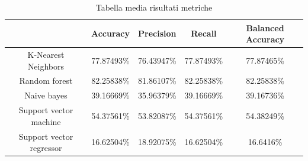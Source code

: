 \begin{table}
    \small %
    \caption{Tabella media risultati metriche}
    \label{tab:1}
    \begin{tabular}{ |c||c|c|c|c| } 
         \hline
          & Accuracy & Precision & Recall & Balanced Accuracy\\ 
         \hline\hline
         K-Nearest Neighbors& 77.87493\% & 76.43947\% & 77.87493\% & 77.87465\%\\
         \hline
         Random forest & 82.25838\% & 81.86107\% & 82.25838\% & 82.25838\%\\
         \hline
         Naive bayes& 39.16669\% & 35.96379\% & 39.16669\% & 39.16736\%\\
         \hline
         Support vector machine& 54.37561\% & 53.82087\% & 54.37561\% & 54.38249\%\\
         \hline
         Support vector regressor& 16.62504\% & 18.92075\% & 16.62504\% & 16.6416\%\\
         \hline
    \end{tabular}
\end{table}

